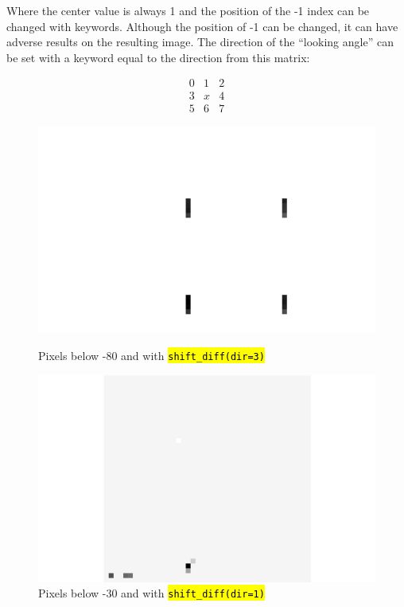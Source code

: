 \documentclass[10pt]{article}
\begin{document}
    Where the center value is always 1 and the position of the -1 index can be changed with keywords. Although the position of -1 can be changed, it can have adverse results on the resulting image. The direction of the ``looking angle'' can be set with a keyword equal to the direction from this matrix:

    \[ \begin{array}{ccc}
    0 & 1 & 2 \\
    3 & x & 4 \\
    5 & 6 & 7 \end{array}\] 

    \begin{figure}[h]
        \begin{minipage}{.45\textwidth}
            \centering
                \includegraphics[width=\linewidth]{plots_tables_images/dir3.png}
                \caption{Pixels below -80 and with \hl{\texttt{shift\_diff(dir=3)}}}
        \end{minipage}
        \hspace{.5in}
        \begin{minipage}{.45\textwidth}
            \centering
                \includegraphics[width=\linewidth]{plots_tables_images/dir1.png}
                \caption{Pixels below -30 and with \hl{\texttt{shift\_diff(dir=1)}}}
        \end{minipage}
    \end{figure}
\end{document}
